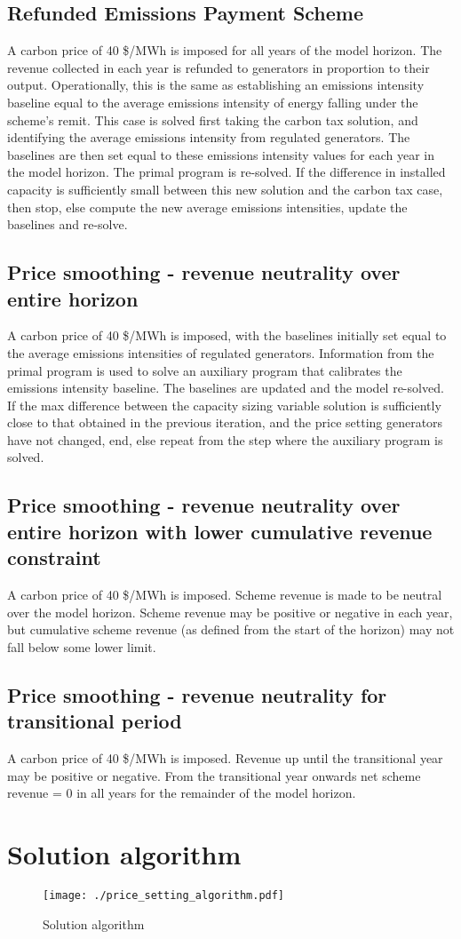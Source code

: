 \documentclass{article}
\begin{document}
\subsection{Refunded Emissions Payment Scheme}
A carbon price of 40 \$/MWh is imposed for all years of the model horizon. The revenue collected in each year is refunded to generators in proportion to their output. Operationally, this is the same as establishing an emissions intensity baseline equal to the average emissions intensity of energy falling under the scheme's remit. This case is solved first taking the carbon tax solution, and identifying the average emissions intensity from regulated generators. The baselines are then set equal to these emissions intensity values for each year in the model horizon. The primal program is re-solved. If the difference in installed capacity is sufficiently small between this new solution and the carbon tax case, then stop, else compute the new average emissions intensities, update the baselines and re-solve.

\subsection{Price smoothing - revenue neutrality over entire horizon}
A carbon price of 40 \$/MWh is imposed, with the baselines initially set equal to the average emissions intensities of regulated generators. Information from the primal program is used to solve an auxiliary program that calibrates the emissions intensity baseline. The baselines are updated and the model re-solved. If the max difference between the capacity sizing variable solution is sufficiently close to that obtained in the previous iteration, and the price setting generators have not changed, end, else repeat from the step where the auxiliary program is solved.

\subsection{Price smoothing - revenue neutrality over entire horizon with lower cumulative revenue constraint}
A carbon price of 40 \$/MWh is imposed. Scheme revenue is made to be neutral over the model horizon. Scheme revenue may be positive or negative in each year, but cumulative scheme revenue (as defined from the start of the horizon) may not fall below some lower limit. 


\subsection{Price smoothing - revenue neutrality for transitional period}
A carbon price of 40 \$/MWh is imposed. Revenue up until the transitional year may be positive or negative. From the transitional year onwards net scheme revenue = 0 in all years for the remainder of the model horizon.

\section{Solution algorithm}

\begin{figure}
	\centering
	\texttt{[image: ./price\_setting\_algorithm.pdf]}
	\caption{Solution algorithm}
\end{figure}
\end{document}

